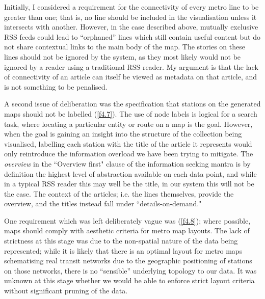 Initially, I considered a requirement for the connectivity \citep{GeneratingInformationMaps} of every metro line to be greater than one; that is, no line should be included in the visualisation unless it intersects with another. However, in the case described above, mutually exclusive RSS feeds could lead to ``orphaned'' lines which still contain useful content but do not share contextual links to the main body of the map. The stories on these lines should not be ignored by the system, as they most likely would not be ignored by a reader using a traditional RSS reader. My argument is that the lack of connectivity of an article can itself be viewed as metadata on that article, and is not something to be penalised.

A second issue of deliberation was the specification that stations on the generated maps should not be labelled (\ref{f4.7}). The use of node labels is logical for a search task, where locating a particular entity or route on a map is the goal. However, when the goal is gaining an insight into the structure of the collection being visualised, labelling each station with the title of the article it represents would only reintroduce the information overload we have been trying to mitigate. The \textit{overview} in the ``Overview first" clause of the information seeking mantra \citep{TheEyesHaveIt} is by definition the highest level of abstraction available on each data point, and while in a typical RSS reader this may well be the title, in our system this will not be the case. The context of the articles; i.e. the lines themselves, provide the overview, and the titles instead fall under ``details-on-demand."

One requirement which was left deliberately vague was (\ref{f4.8}); where possible, maps should comply with  aesthetic criteria for metro map layouts. The lack of strictness at this stage was due to the non-spatial nature of the data being represented; while it is likely that there is an optimal layout for metro maps schematising real transit networks due to the geographic positioning of stations on those networks, there is no ``sensible'' underlying topology to our data. It was unknown at this stage whether we would be able to enforce strict layout criteria without significant pruning of the data.





